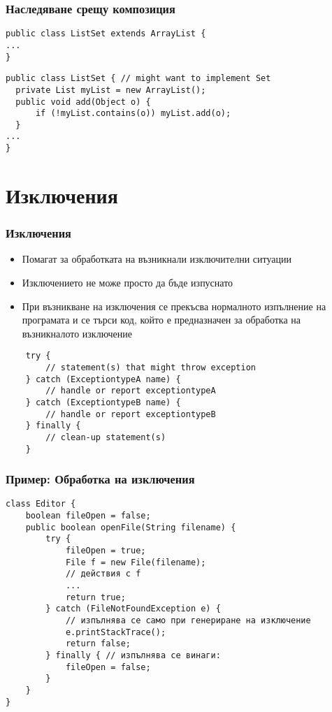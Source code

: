 \documentclass[ignorenonframetext, hyperref=unicode,compress,pdflatex]{beamer}
\begin{document}
\begin{frame}[containsverbatim]\frametitle{Наследяване срещу композиция}
\begin{lstlisting}
public class ListSet extends ArrayList { 
...
} 
\end{lstlisting}

\begin{lstlisting}
public class ListSet { // might want to implement Set
  private List myList = new ArrayList();
  public void add(Object o) {
      if (!myList.contains(o)) myList.add(o);
  }
...
}
\end{lstlisting}
\end{frame}


\section{Изключения}

\begin{frame}[containsverbatim]\frametitle{Изключения}
\begin{itemize}
\item Помагат за обработката на възникнали изключителни ситуации
\item Изключението не може просто да бъде изпуснато
\item При възникване на изключения се прекъсва нормалното изпълнение на програмата и се търси код, който е предназначен за обработка на възникналото изключение
\end{itemize}
\begin{lstlisting}
	try {
		// statement(s) that might throw exception
	} catch (ExceptiontypeA name) {
		// handle or report exceptiontypeA
	} catch (ExceptiontypeB name) {
		// handle or report exceptiontypeB
	} finally {
		// clean-up statement(s)
	}
\end{lstlisting}
\end{frame}

\begin{frame}[containsverbatim]\frametitle{Пример: Обработка на изключения}
\begin{lstlisting}
class Editor {
	boolean fileOpen = false;
 	public boolean openFile(String filename) {
 		try {
			fileOpen = true;
 			File f = new File(filename);
 			// действия с f
			...
 			return true;
 		} catch (FileNotFoundException e) {
 			// изпълнява се само при генериране на изключение
			e.printStackTrace();
 			return false;
 		} finally { // изпълнява се винаги:
 			fileOpen = false;
		}
	}
}
\end{lstlisting}
\end{frame}
\end{document}
